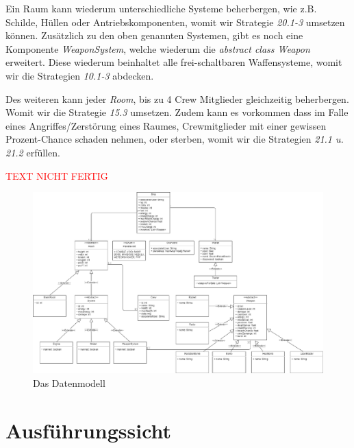 \documentclass[fontsize=12pt,paper=a4,twoside]{scrartcl}
\begin{document}
Ein Raum kann wiederum unterschiedliche Systeme beherbergen, wie z.B. Schilde, Hüllen oder Antriebskomponenten, womit wir Strategie \textit{20.1-3} umsetzen können. Zusätzlich zu den oben genannten Systemen, gibt es noch eine Komponente \textit{WeaponSystem}, welche wiederum die \textit{abstract class Weapon} erweitert. Diese wiederum beinhaltet alle frei-schaltbaren Waffensysteme, womit wir die Strategien \textit{10.1-3} abdecken.

Des weiteren kann jeder \textit{Room}, bis zu 4 Crew Mitglieder gleichzeitig beherbergen. Womit wir die Strategie \textit{15.3} umsetzen. Zudem kann es vorkommen dass im Falle eines Angriffes/Zerstörung eines Raumes, Crewmitglieder mit einer gewissen Prozent-Chance schaden nehmen, oder sterben, womit wir die Strategien \textit{21.1 u. 21.2} erfüllen.

\textcolor{red}{TEXT NICHT FERTIG}

\begin{figure}[H]
\begin{center}
  \includegraphics[width=\linewidth]{UML/Datenmodell.pdf}
    \caption{Das Datenmodell}
\end{center}
\end{figure}


\section{Ausführungssicht} \label{sec:ausfuehrung}

\end{document}

